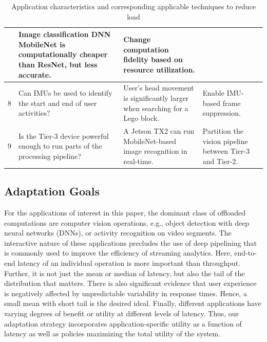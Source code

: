 \begin{table}[]
\begin{tabular}{|r|p{35ex}|p{43ex}|p{32ex}|}
        & Image classification DNN MobileNet is computationally cheaper than ResNet, but less accurate. 
        & Change computation fidelity based on resource utilization. \\ \hline
    8&Can IMUs be used to identify the start and end of user activities?
        & User's head movement is significantly larger when searching for a Lego block.
        & Enable IMU-based frame suppression. \\ \hline
    9&Is the Tier-3 device powerful enough to run parts of the processing pipeline?
        & A Jetson TX2 can run MobileNet-based image recognition in real-time.
        & Partition the vision pipeline between Tier-3 and Tier-2.   \\ \hline
    \end{tabular}
\vspace{0.1in}
    \caption{\small Application characteristics and corresponding applicable techniques to reduce load}
    \label{tab:questions-techniques}
\end{table}

\subsection{Adaptation Goals}
 
For the applications of interest in this paper, the dominant class of offloaded
computations are computer vision operations, e.g., object detection with deep
neural networks (DNNs), or activity recognition on video segments. The
interactive nature of these applications precludes the use of deep pipelining
that is commonly used to improve the efficiency of streaming analytics.  Here,
end-to-end latency of an individual operation is more important than
throughput. Further, it is not just the mean or median of latency, but also the
tail of the distribution that matters.  There is also significant evidence that
user experience is negatively affected by unpredictable variability in response
times. Hence, a small mean with short tail is the desired ideal. Finally,
different applications have varying degrees of benefit or utility at different
levels of latency.  Thus, our adaptation strategy incorporates
application-specific utility as a function of latency as well as policies
maximizing the total utility of the system.


